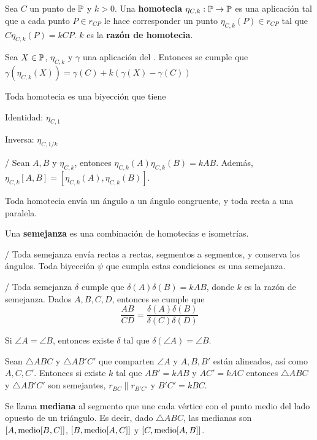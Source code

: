  Sea $C$ un punto de $\P$ y $k > 0$. Una \textbf{homotecia} $\eta_{C,k}:\P \rightarrow \P$ es una aplicación tal que a cada punto $P \in r_{CP}$ le hace corresponder un punto $\eta_{C,k}(P) \in r_{CP}$ tal que $C\eta_{C,k}(P) = kCP$. $k$ es la \textbf{razón de homotecia}.

 Sea $X \in \P$, $\eta_{C,k}$ y $\gamma$ una aplicación del . Entonces se cumple que $\gamma(\eta_{C,k}(X)) = \gamma(C) + k(\gamma(X)-\gamma(C))$

 Toda homotecia es una biyección que tiene
\begin{itemizex}
	\item Identidad: $\eta_{C,1}$
	\item Inversa: $\eta_{C,1/k}$
\end{itemizex}

/ Sean $A, B$ y $\eta_{C,k}$, entonces $\eta_{C,k}(A)\eta_{C,k}(B) = kAB$. Además, $\eta_{C,k}[A,B] = [\eta_{C,k}(A), \eta_{C,k}(B)]$.

 Toda homotecia envía un ángulo a un ángulo congruente, y toda recta a una paralela.

 Una \textbf{semejanza} es una combinación de homotecias e isometrías.

 /  Toda semejanza envía rectas a rectas, segmentos a segmentos, y conserva los ángulos. Toda biyección $\psi$ que cumpla estas condiciones es una semejanza.

 /  Toda semejanza $\delta$ cumple que $\delta(A)\delta(B) = kAB$, donde $k$ es la razón de semejanza. Dados $A,B,C,D$, entonces se cumple que 
$$\frac{AB}{CD} = \frac{\delta(A)\delta(B)}{\delta(C)\delta(D)}$$

 Si $\angle A = \angle B$, entonces existe $\delta$ tal que $\delta(\angle A) = \angle B$.

 Sean $\triangle ABC$ y $\triangle AB'C'$ que comparten $\angle A$ y $A,B,B'$ están alineados, así como $A, C, C'$. Entonces si existe $k$ tal que $AB' = kAB$ y $AC' = kAC$ entonces $\triangle ABC$ y $\triangle AB'C'$ son semejantes, $r_{BC} \parallel r_{B'C'}$ y $B'C' = kBC$.

 Se llama \textbf{mediana} al segmento que une cada vértice con el punto medio del lado opuesto de un triángulo. Es decir, dado $\triangle ABC$, las medianas son $[A, \m[B,C]]$, $[B, \m[A,C]]$ y $[C, \m[A,B]]$.

